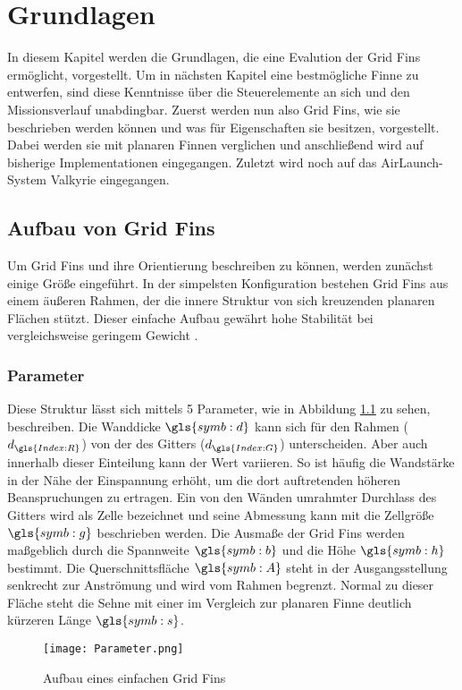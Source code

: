 \chapter{Grundlagen}
\label{sec:grundlagen}
In diesem Kapitel werden die Grundlagen, die eine Evalution der Grid Fins ermöglicht, vorgestellt. Um in nächsten Kapitel eine bestmögliche Finne zu entwerfen, sind diese Kenntnisse über die Steuerelemente an sich und den Missionsverlauf unabdingbar.
Zuerst werden nun also Grid Fins, wie sie beschrieben werden können und was für Eigenschaften sie besitzen, vorgestellt. Dabei werden sie mit planaren Finnen verglichen und anschließend wird auf bisherige Implementationen eingegangen. Zuletzt wird noch auf das AirLaunch-System Valkyrie eingegangen.
\section{Aufbau von Grid Fins}
Um Grid Fins und ihre Orientierung beschreiben zu können, werden zunächst einige Größe eingeführt.
In der simpelsten Konfiguration bestehen Grid Fins aus einem äußeren Rahmen, der die innere Struktur von sich kreuzenden planaren Flächen stützt. Dieser einfache Aufbau gewährt hohe Stabilität bei vergleichsweise geringem Gewicht \cite{zellform}.
\subsection{Parameter}
Diese Struktur lässt sich mittels 5 Parameter, wie in Abbildung \ref{abb_parameter} zu sehen, beschreiben. Die Wanddicke $\gls{symb:d}$ kann sich für den Rahmen ($d_{\gls{Index:R}}$) von der des Gitters ($d_{\gls{Index:G}}$) unterscheiden. Aber auch innerhalb dieser Einteilung kann der Wert variieren. So ist häufig die Wandstärke in der Nähe der Einspannung erhöht, um die dort auftretenden höheren Beanspruchungen zu ertragen. Ein von den Wänden umrahmter Durchlass des Gitters wird als Zelle bezeichnet und seine Abmessung kann mit die Zellgröße $\gls{symb:g}$ beschrieben werden. Die Ausmaße der Grid Fins werden maßgeblich durch die Spannweite $\gls{symb:b}$ und die Höhe $\gls{symb:h}$ bestimmt. Die Querschnittsfläche $\gls{symb:A}$ steht in der Ausgangsstellung senkrecht zur Anströmung und wird vom Rahmen begrenzt. Normal zu dieser Fläche steht die Sehne mit einer im Vergleich zur planaren Finne deutlich kürzeren Länge $\gls{symb:s}$.\\
\begin{figure}[h]
	\centering
	\texttt{[image: Parameter.png]}
	\caption{Aufbau eines einfachen Grid Fins}
	\label{abb_parameter}
\end{figure}\\
